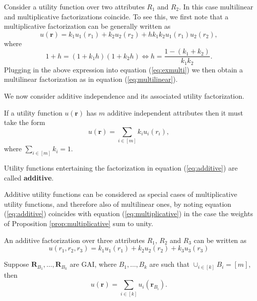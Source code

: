 \begin{example} 
Consider a utility function over two attributes $R_1$ and $R_2$. In this case multilinear and multiplicative factorizations coincide. To see this, we first note that a multiplicative factorization can be generally written as
\begin{equation}
u(\bm{r})=k_1u_1(r_1)+k_2u_2(r_2)+hk_1k_2u_1(r_1)u_2(r_2),
\label{eq:exmulti}
\end{equation}
where 
\begin{equation*}
\label{eq:hexample}
1+h=(1+k_1h)(1+k_2h) \Longleftrightarrow h=\frac{1-(k_1+k_2)}{k_1k_2}.
\end{equation*}
Plugging in the above expression into equation (\ref{eq:exmulti}) we then obtain a multilinear factorization as in equation (\ref{eq:multilinear}).
\end{example}

We now consider additive independence and its associated utility factorization.
\begin{proposition}
If a utility function $u(\bm{r})$ has $m$ additive independent attributes then it must take the form
\begin{equation}
\label{eq:additive}
u(\bm{r})=\sum_{i\in[m]}k_iu_i(r_i),
\end{equation}
where $\sum_{i\in [m]}k_i=1$.
\end{proposition}

\begin{definition}
Utility functions entertaining the factorization in equation (\ref{eq:additive}) are called \textbf{additive}.
\end{definition}

Additive utility functions can be considered as special cases of multiplicative utility functions, and therefore also of multilinear ones, by noting equation (\ref{eq:additive}) coincides with equation (\ref{eq:multiplicative}) in the case the weights of Proposition \ref{prop:multiplicative} sum to unity.

\begin{example}
An additive factorization over three attributes $R_1$, $R_2$ and $R_3$ can be written as
\begin{equation*}
\label{eq:exampleadditive}
u(r_1,r_2,r_3)=k_1u_1(r_1)+k_2u_2(r_2)+k_3u_3(r_3)
\end{equation*}
\end{example}

\begin{proposition}
\label{prop:gai}
Suppose $\bm{R}_{B_1},\dots,\bm{R}_{B_k}$ are \gls{GAI}, where $B_1,\dots, B_k$ are such that $\cup_{i\in[k]}B_i=[m]$, then
\begin{equation*}
\label{eq:GAI}
u(\bm{r})=\sum_{i\in[k]}u_i(\bm{r}_{B_i}).
\end{equation*}
\end{proposition}

